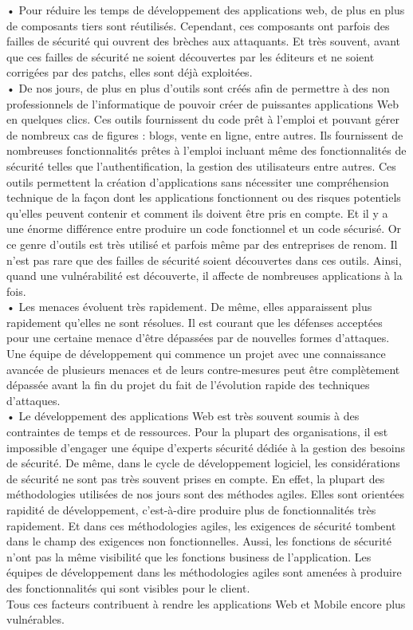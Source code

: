 • Pour réduire les temps de développement des applications web, de plus en plus de composants tiers sont réutilisés. Cependant, ces composants ont parfois des failles de sécurité qui ouvrent des brèches aux attaquants. Et très souvent, avant que ces failles de sécurité ne soient découvertes par les éditeurs et ne soient corrigées par des patchs, elles sont déjà exploitées.\\
• De nos jours, de plus en plus d’outils sont créés afin de permettre à des non professionnels de l’informatique de pouvoir créer de puissantes applications Web en quelques clics. Ces outils fournissent du code prêt à l’emploi et pouvant gérer de nombreux cas de figures : blogs, vente en ligne, entre autres. Ils fournissent de nombreuses fonctionnalités prêtes à l’emploi incluant même des fonctionnalités de sécurité telles que l’authentification, la gestion des utilisateurs entre autres. Ces outils permettent la création d’applications sans nécessiter une compréhension technique de la façon dont les applications fonctionnent ou des risques potentiels qu'elles peuvent contenir et comment ils doivent être pris en compte. Et il y a une énorme différence entre produire un code fonctionnel et un code sécurisé. Or ce genre d’outils est très utilisé et parfois même par des entreprises de renom. Il n’est pas rare que des failles de sécurité soient découvertes dans ces outils. Ainsi, quand une vulnérabilité est découverte, il affecte de nombreuses applications à la fois.\\
• Les menaces évoluent très rapidement. De même, elles apparaissent plus rapidement qu’elles ne sont résolues. Il est courant que les défenses acceptées pour une certaine menace d’être dépassées par de nouvelles formes d’attaques. Une équipe de développement qui commence un projet avec une connaissance avancée de plusieurs menaces et de leurs contre-mesures peut être complètement dépassée avant la fin du projet du fait de l’évolution rapide des techniques d’attaques.\\
• Le développement des applications Web est très souvent soumis à des contraintes de temps et de ressources. Pour la plupart des organisations, il est impossible d’engager une équipe d’experts sécurité dédiée à la gestion des besoins de sécurité. De même, dans le cycle de développement logiciel, les considérations de sécurité ne sont pas très souvent prises en compte. En effet, la plupart des méthodologies utilisées de nos jours sont des méthodes agiles. Elles sont orientées rapidité de développement, c’est-à-dire produire plus de fonctionnalités très rapidement. Et dans ces méthodologies agiles, les exigences de sécurité tombent dans le champ des exigences non fonctionnelles. Aussi, les fonctions de sécurité n’ont pas la même visibilité que les fonctions business de l’application. Les équipes de développement dans les méthodologies agiles sont amenées à produire des fonctionnalités qui sont visibles pour le client. \\
Tous ces facteurs contribuent à rendre les applications Web et Mobile encore plus vulnérables. 

